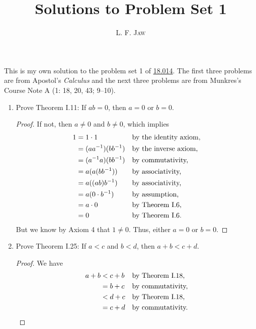 \documentclass[a4paper]{article}
\title{Solutions to Problem Set 1}
\author{L. F. \textsc{Jaw}}
\begin{document}
\maketitle

This is my own solution to the problem set 1 of
\href{https://ocw.mit.edu/courses/mathematics/18-014-calculus-with-theory-fall-2010/assignments/}{18.014}.
The first three problems are from Apostol's \emph{Calculus} and the next
three problems are from Munkres's Course Note A (1: 18, 20, 43; 9--10).

\begin{enumerate}
\item Prove Theorem I.11: If \(ab=0\), then \(a=0\) or \(b=0\).

  \begin{proof}
    If not, then \(a \ne 0\) and \(b \ne 0\), which implies
    \begin{align*}
      1 &= 1 \cdot 1           && \text{by the identity axiom,} \\
        &= (aa^{-1}) (bb^{-1}) && \text{by the inverse axiom,} \\
        &= (a^{-1}a) (bb^{-1}) && \text{by commutativity,} \\
        &= a (a(bb^{-1}))      && \text{by associativity,} \\
        &= a ((ab)b^{-1})      && \text{by associativity,} \\
        &= a (0 \cdot b^{-1})  && \text{by assumption,} \\
        &= a \cdot 0           && \text{by Theorem I.6,} \\
        &= 0                   && \text{by Theorem I.6.}
    \end{align*}
    But we know by Axiom 4 that \(1 \ne 0\).  Thus, either \(a = 0\) or
    \(b = 0\).
  \end{proof}

\item Prove Theorem I.25: If \(a < c\) and \(b < d\), then \(a+b < c+d\).

  \begin{proof}
    We have
    \begin{align*}
      a + b &< c + b && \text{by Theorem I.18,} \\
            &= b + c && \text{by commutativity,} \\
            &< d + c && \text{by Theorem I.18,} \\
            &= c + d && \text{by commutativity.} \qedhere
    \end{align*}
  \end{proof}


\end{enumerate}
\end{document}
